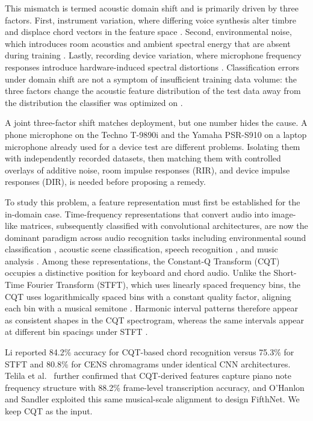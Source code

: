 \documentclass[pdflatex,sn-mathphys-num,iicol]{sn-jnl}
\theoremstyle{thmstyleone}
\theoremstyle{thmstyletwo}
\theoremstyle{thmstylethree}
\begin{document}
This mismatch is termed acoustic domain shift and is primarily driven by three factors. First, instrument variation, where differing voice synthesis alter timbre and displace chord vectors in the feature space \cite{Kusaka2024}\cite{Majchrzak2025}. Second, environmental noise, which introduces room acoustics and ambient spectral energy that are absent during training \cite{Majchrzak2025}. Lastly, recording device variation, where microphone frequency responses introduce hardware-induced spectral distortions \cite{Kusaka2024}. Classification errors under domain shift are not a symptom of insufficient training data volume: the three factors change the acoustic feature distribution of the test data away from the distribution the classifier was optimized on \cite{Kusaka2024}\cite{Majchrzak2025}.

A joint three-factor shift matches deployment, but one number hides the cause. A phone microphone on the Techno T-9890i and the Yamaha PSR-S910 on a laptop microphone already used for a device test are different problems. Isolating them with independently recorded datasets, then matching them with controlled overlays of additive noise, room impulse responses (RIR), and device impulse responses (DIR), is needed before proposing a remedy.

To study this problem, a feature representation must first be established for the in-domain case. Time-frequency representations that convert audio into image-like matrices, subsequently classified with convolutional architectures, are now the dominant paradigm across audio recognition tasks including environmental sound classification \cite{Wolf-Monheim2025}, acoustic scene classification, speech recognition \cite{Zaman2023}, and music analysis \cite{Moysis2023}. Among these representations, the Constant-Q Transform (CQT) occupies a distinctive position for keyboard and chord audio. Unlike the Short-Time Fourier Transform (STFT), which uses linearly spaced frequency bins, the CQT uses logarithmically spaced bins with a constant quality factor, aligning each bin with a musical semitone \cite{Lacoste2007}. Harmonic interval patterns therefore appear as consistent shapes in the CQT spectrogram, whereas the same intervals appear at different bin spacings under STFT \cite{Li2021}.

Li \cite{Li2021} reported 84.2\% accuracy for CQT-based chord recognition versus 75.3\% for STFT and 80.8\% for CENS chromagrams under identical CNN architectures. Telila et al.\ \cite{Telila2023} further confirmed that CQT-derived features capture piano note frequency structure with 88.2\% frame-level transcription accuracy, and O'Hanlon and Sandler \cite{OHanlon2021} exploited this same musical-scale alignment to design FifthNet. We keep CQT as the input.
\end{document}
